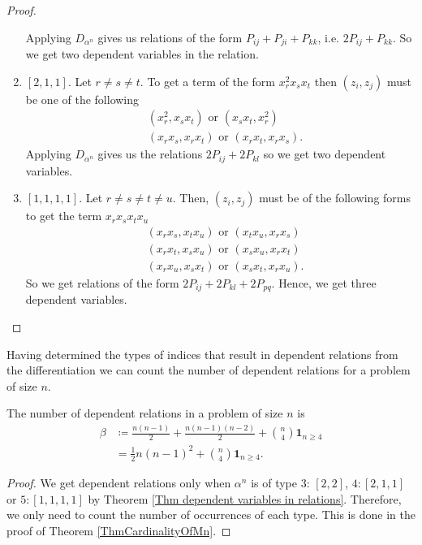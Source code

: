 \documentclass[a4paper,12pt,twoside,BCOR=10mm]{scrbook}
\begin{document}
\begin{theorem}
\begin{proof}
\begin{enumerate}[1:]
    Applying $D_{\alpha^n}$ gives us relations of the form $P_{ij} + P_{ji} + P_{kk}$, i.e. $2P_{ij} + P_{kk}$. So we get two dependent variables in the relation.
    \item $[2, 1, 1]$. Let $r \neq s \neq t$. To get a term of the form $x_r^2 x_s x_t$ then $(z_i, z_j)$ must be one of the following
    \begin{align*}
        &(x_r^2, x_sx_t) \text{ or } (x_sx_t, x_r^2)\\
        &(x_rx_s, x_rx_t) \text{ or } (x_rx_t, x_rx_s).
    \end{align*}
    Applying $D_{\alpha^n}$ gives us the relations $2P_{ij} + 2P_{kl}$ so we get two dependent variables.
    \item $[1,1,1,1]$. Let $r \neq s \neq t \neq u$. Then, $(z_i, z_j)$ must be of the following forms to get the term $x_r x_s x_t x_u$
    \begin{align*}
        &(x_rx_s, x_tx_u) \text{ or } (x_tx_u, x_rx_s)\\
        &(x_rx_t, x_sx_u) \text{ or } (x_sx_u, x_rx_t)\\
        &(x_rx_u, x_sx_t) \text{ or } (x_sx_t, x_rx_u).
    \end{align*}
    So we get relations of the form $2P_{ij} + 2P_{kl} + 2P_{pq}$. Hence, we get three dependent variables.
\end{enumerate}
\end{proof}
\end{theorem}

Having determined the types of indices that result in dependent relations from the differentiation we can count the number of dependent relations for a problem of size $n$.

\begin{corollary}\label{CorNumberOfDependentRelations}
The number of dependent relations in a problem of size $n$ is
\begin{align*}
    \beta &\coloneqq \frac{n(n-1)}{2} + \frac{n(n-1)(n-2)}{2} + \binom{n}{4}\mathbf{1}_{n\geq 4}\\
    &= \frac{1}{2}n(n - 1)^2 + \binom{n}{4}\mathbf{1}_{n\geq 4}.
\end{align*}
\end{corollary}
\begin{proof}
We get dependent relations only when $\alpha^n$ is of type $3:\, [2,2]$, $4: [2,1,1]$ or $5: [1,1,1,1]$ by Theorem \ref{Thm dependent variables in relations}. Therefore, we only need to count the number of occurrences of each type. This is done in the proof of Theorem \ref{ThmCardinalityOfMn}.
\end{proof}
\end{document}
